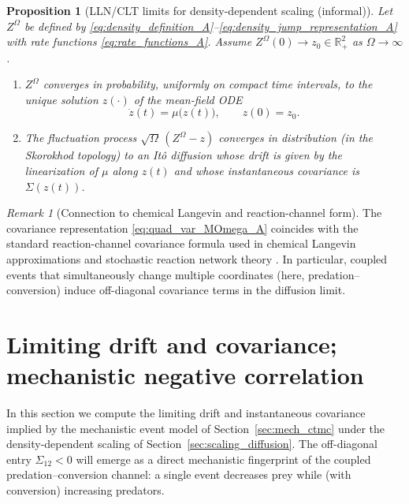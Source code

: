 \documentclass[pdflatex,sn-mathphys-ay]{sn-jnl}
\theoremstyle{thmstyleone}
\newtheorem{proposition}[theorem]{Proposition}
\theoremstyle{definition}
\theoremstyle{remark}
\newtheorem{remark}[theorem]{Remark}
\begin{document}
\begin{proposition}[LLN/CLT limits for density-dependent scaling (informal)]\label{prop:lln_clt_informal_A}
Let $Z^\Omega$ be defined by \eqref{eq:density_definition_A}--\eqref{eq:density_jump_representation_A} with rate
functions \eqref{eq:rate_functions_A}. Assume $Z^\Omega(0)\to z_0\in\mathbb{R}_+^2$ as $\Omega\to\infty$.
\begin{enumerate}
\item[(LLN)] $Z^\Omega$ converges in probability, uniformly on compact time intervals, to the unique solution $z(\cdot)$
of the mean-field ODE
\begin{equation}\label{eq:LLN_limit_ODE_A}
\dot z(t)=\mu\bigl(z(t)\bigr),\qquad z(0)=z_0.
\end{equation}
\item[(CLT)] The fluctuation process $\sqrt{\Omega}\,(Z^\Omega-z)$ converges in distribution (in the Skorokhod topology)
to an It\^o diffusion whose drift is given by the linearization of $\mu$ along $z(t)$ and whose instantaneous covariance
is $\Sigma(z(t))$.
\end{enumerate}
\end{proposition}

\begin{remark}[Connection to chemical Langevin and reaction-channel form]\label{rem:cle_connection_A}
The covariance representation \eqref{eq:quad_var_MOmega_A} coincides with the standard reaction-channel covariance
formula used in chemical Langevin approximations and stochastic reaction network theory
\citep{gillespie_exact_1977,gillespie_chemical_2000,kampen_stochastic_2007,anderson_continuous_2011}.
In particular, coupled events that simultaneously change multiple coordinates (here, predation--conversion) induce
off-diagonal covariance terms in the diffusion limit.
\end{remark}

\section{Limiting drift and covariance; mechanistic negative correlation}
\label{sec:mu_sigma_factorization}

In this section we compute the limiting drift and instantaneous covariance implied by the mechanistic event model
of Section~\ref{sec:mech_ctmc} under the density-dependent scaling of Section~\ref{sec:scaling_diffusion}.
The off-diagonal entry $\Sigma_{12}<0$ will emerge as a direct mechanistic fingerprint of the coupled
predation--conversion channel: a single event decreases prey while (with conversion) increasing predators.
\end{document}
